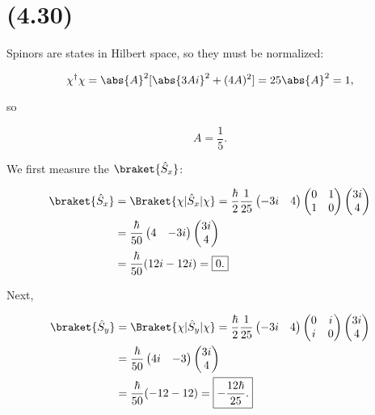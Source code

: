 \section{(4.30)}



\begin{parts}

\item Spinors are states in Hilbert space, so they must be normalized:

\begin{equation}
    \chi^{\dagger}\chi = \abs{A}^2[\abs{3Ai}^2 + (4A)^2] = 25\abs{A}^2 = 1,
\end{equation}

so

\begin{equation}
    \boxed{A = \frac{1}{5}.}
\end{equation}


\item We first measure the $\braket{\hat{S}_x}$:

\begin{align}
    \braket{\hat{S}_x} &= \Braket{\chi | \hat{S}_x | \chi} = \frac{\hbar}{2}\frac{1}{25}\begin{pmatrix}-3i & 4\end{pmatrix}\begin{pmatrix}0 & 1 \\ 1 & 0\end{pmatrix}\begin{pmatrix}3i \\ 4\end{pmatrix} \\
    &= \frac{\hbar}{50}\begin{pmatrix}4 & -3i\end{pmatrix}\begin{pmatrix}3i \\ 4\end{pmatrix} \\
    &= \frac{\hbar}{50}(12i-12i) = \boxed{0.}
\end{align}

Next,


\begin{align}
    \braket{\hat{S}_y} &= \Braket{\chi | \hat{S}_y | \chi} = \frac{\hbar}{2}\frac{1}{25}\begin{pmatrix}-3i & 4\end{pmatrix}\begin{pmatrix}0 & i \\ i & 0\end{pmatrix}\begin{pmatrix}3i \\ 4\end{pmatrix} \\
    &= \frac{\hbar}{50}\begin{pmatrix}4i & -3\end{pmatrix}\begin{pmatrix}3i \\ 4\end{pmatrix} \\
    &= \frac{\hbar}{50}(-12-12) = \boxed{-\frac{12\hbar}{25}.}
\end{align}


\end{parts}
